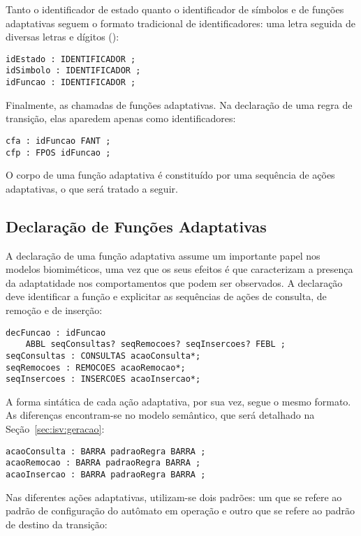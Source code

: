 \noindent
Tanto o identificador de estado quanto o identificador de símbolos e de funções adaptativas seguem o formato tradicional de identificadores: uma letra seguida de diversas letras e dígitos ():

\begin{lstlisting}[style=antlr]
idEstado : IDENTIFICADOR ;
idSimbolo : IDENTIFICADOR ;
idFuncao : IDENTIFICADOR ;
\end{lstlisting}

Finalmente, as chamadas de funções adaptativas. Na declaração de uma regra de transição, elas aparedem apenas como identificadores:

\begin{lstlisting}[style=antlr]
cfa : idFuncao FANT ;
cfp : FPOS idFuncao ;
\end{lstlisting}

\noindent
O corpo de uma função adaptativa é constituído por uma sequência de ações adaptativas, o que será tratado a seguir.

\subsection*{Declaração de Funções Adaptativas}

A declaração de uma função adaptativa assume um importante papel nos modelos biomiméticos, uma vez que os seus efeitos é que caracterizam a presença da adaptatidade nos comportamentos que podem ser observados. A declaração deve identificar a função e explicitar as sequências de ações de consulta, de remoção e de inserção:

\begin{lstlisting}[style=antlr]
decFuncao : idFuncao
	ABBL seqConsultas? seqRemocoes? seqInsercoes? FEBL ;
seqConsultas : CONSULTAS acaoConsulta*;
seqRemocoes : REMOCOES acaoRemocao*;
seqInsercoes : INSERCOES acaoInsercao*;
\end{lstlisting}

A forma sintática de cada ação adaptativa, por sua vez, segue o mesmo formato. As diferenças encontram-se no modelo semântico, que será detalhado na Seção~\ref{sec:isv:geracao}:

\begin{lstlisting}[style=antlr]
acaoConsulta : BARRA padraoRegra BARRA ;
acaoRemocao : BARRA padraoRegra BARRA ;
acaoInsercao : BARRA padraoRegra BARRA ;
\end{lstlisting}

Nas diferentes ações adaptativas, utilizam-se dois padrões: um que se refere ao padrão de configuração do autômato em operação e outro que se refere ao padrão de destino da transição:

